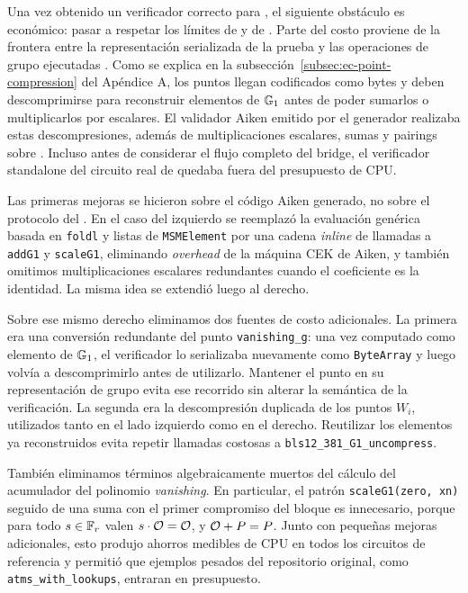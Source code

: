 Una vez obtenido un verificador correcto para \MidnightSTMCircuit, el siguiente obstáculo es económico: pasar a respetar los límites de \maxTxSize y \maxTxExUnits de \Cardano. Parte del costo proviene de la frontera entre la representación serializada de la prueba y las operaciones de grupo ejecutadas \Onchain. Como se explica en la subsección~\ref{subsec:ec-point-compression} del Apéndice A, los puntos llegan codificados como bytes y deben descomprimirse para reconstruir elementos de $\mathbb{G}_1$ antes de poder sumarlos o multiplicarlos por escalares. El validador Aiken emitido por el generador realizaba estas descompresiones, además de multiplicaciones escalares, sumas y pairings sobre \BLS. Incluso antes de considerar el flujo completo del bridge, el verificador standalone del circuito real de \Mithril quedaba fuera del presupuesto de CPU.

Las primeras mejoras se hicieron sobre el código Aiken generado, no sobre el protocolo del \zkBridge. En el caso del \MSM izquierdo se reemplazó la evaluación genérica basada en \texttt{foldl} y listas de \texttt{MSMElement} por una cadena \textit{inline} de llamadas a \texttt{addG1} y \texttt{scaleG1}, eliminando \textit{overhead} de la máquina CEK de Aiken, y también omitimos multiplicaciones escalares redundantes cuando el coeficiente es la identidad. La misma idea se extendió luego al \MSM derecho.

Sobre ese mismo \MSM derecho eliminamos dos fuentes de costo adicionales. La primera era una conversión redundante del punto \texttt{vanishing\_g}: una vez computado como elemento de $\mathbb{G}_1$, el verificador lo serializaba nuevamente como \texttt{ByteArray} y luego volvía a descomprimirlo antes de utilizarlo. Mantener el punto en su representación de grupo evita ese recorrido sin alterar la semántica de la verificación. La segunda era la descompresión duplicada de los puntos $W_i$, utilizados tanto en el lado izquierdo como en el derecho. Reutilizar los elementos ya reconstruidos evita repetir llamadas costosas a \texttt{bls12\_381\_G1\_uncompress}.

También eliminamos términos algebraicamente muertos del cálculo del acumulador del polinomio \textit{vanishing}. En particular, el patrón \texttt{scaleG1(zero, xn)} seguido de una suma con el primer compromiso del bloque es innecesario, porque para todo $s \in \mathbb{F}_r$ valen $s \cdot \mathcal{O} = \mathcal{O}$, y $\mathcal{O} + P = P$. Junto con pequeñas mejoras adicionales, esto produjo ahorros medibles de CPU en todos los circuitos de referencia y permitió que ejemplos pesados del repositorio original, como \texttt{atms\_with\_lookups}, entraran en presupuesto.

